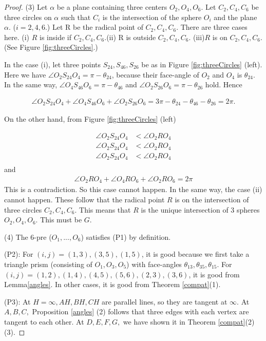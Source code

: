 \documentclass[suppldata, dvipdfmx]{interact}
\theoremstyle{plain}%
\theoremstyle{definition}
\theoremstyle{remark}
\theoremstyle{problemstyle}
\begin{document}
\begin{proof}
(3) Let $\alpha$ be a plane containing three centers $O_2, O_4, O_6$. Let
 $C_2, C_4, C_6$ be three circles on $\alpha$ such that $C_i$ is the
 intersection of the sphere $O_i$ and the plane $\alpha$. ($i=2, 4, 6$.)
Let R be the radical point of $C_2, C_4, C_6$. There are three cases
 here.
(i) $R$ is inside if $C_2, C_4, C_6$.(ii) R is outside $C_2, C_4, C_6$.
(iii)$R$ is on $C_2, C_4, C_6$. (See Figure \ref{fig:threeCircles}.)

In the case (i), let three points $S_{24}, S_{46}, S_{26}$ be as in Figure
\ref{fig:threeCircles} (left). Here we have
$\angle O_2 S_{24} O_4 = \pi - \theta_{24}$,
because their face-angle of $O_2$ and $O_4$ is $\theta_{24}$.
In the same way, $\angle O_4 S_{46}O_6 = \pi - \theta_{46}$ and
$\angle O_2S_{26}O_6 = \pi-\theta_{26}$ hold. Hence

\begin{align*}
 \angle O_2 S_{24} O_4 + \angle O_4 S_{46} O_6 + \angle O_2 S_{26} O_6 = 3\pi -
 \theta_{24} - \theta_{46} - \theta_{26} = 2\pi.
\end{align*}

On the other hand, from Figure \ref{fig:threeCircles} (left)

\begin{align*}
 \angle O_2 S_{24} O_4 &< \angle O_2 R O_4\\
 \angle O_2 S_{24} O_4 &< \angle O_2 R O_4\\
 \angle O_2 S_{24} O_4 &< \angle O_2 R O_4\\
\end{align*}
and
\begin{align*}
 \angle O_2 R O_4 + \angle O_4 R O_6 + \angle O_2 R O_6 = 2\pi
\end{align*}
This is a contradiction. So this case cannot happen. In the same way,
 the case (ii) cannot happen. These follow that the radical point $R$
 is on the intersection of three circles $C_2, C_4, C_6.$ This means that
 $R$ is the unique intersection of 3 spheres $O_2, O_4, O_6$. This must
 be $G$.

(4) The 6-pre ($O_1, ..., O_6$) satisfies (P1) by definition.

(P2): For $(i, j) = (1, 3), (3, 5), (1, 5)$, it is good because we first
 take a triangle prism (consisting of $O_1, O_3, O_5$) with face-angles
 $\theta_{13}, \theta_{35}, \theta_{15}.$ 
For $(i, j) = (1, 2), (1, 4), (4, 5), (5, 6), (2, 3), (3, 6)$, it is
 good from Lemma\ref{angles}. In other cases, it is good from Theorem
 \ref{compat}(1).

(P3): At $H = \infty, AH, BH, CH$ are parallel lines, so they are tangent
 at $\infty$. At $A, B, C,$ Proposition \ref{angles} (2) follows that three edges
 with each vertex are tangent to each other. At $D, E, F, G,$ we have
 shown it in Theorem \ref{compat}(2)(3). 
\end{proof}
\end{document}
